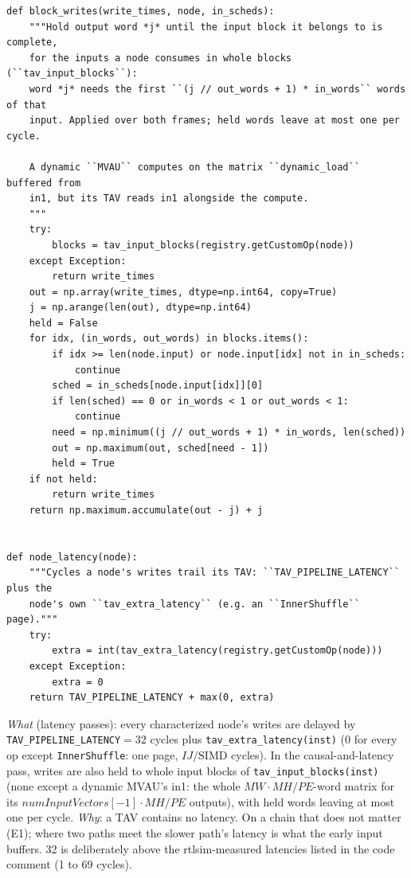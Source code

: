 \documentclass[10pt,a4paper]{article}
\newcommand{\code}[1]{\texttt{#1}}
\begin{document}
\begin{lstlisting}[firstnumber=521,title={\texttt{src/finn/transformation/fpgadataflow/derive\_characteristic.py}, lines 521--558}]
def block_writes(write_times, node, in_scheds):
    """Hold output word *j* until the input block it belongs to is complete,
    for the inputs a node consumes in whole blocks (``tav_input_blocks``):
    word *j* needs the first ``(j // out_words + 1) * in_words`` words of that
    input. Applied over both frames; held words leave at most one per cycle.

    A dynamic ``MVAU`` computes on the matrix ``dynamic_load`` buffered from
    in1, but its TAV reads in1 alongside the compute.
    """
    try:
        blocks = tav_input_blocks(registry.getCustomOp(node))
    except Exception:
        return write_times
    out = np.array(write_times, dtype=np.int64, copy=True)
    j = np.arange(len(out), dtype=np.int64)
    held = False
    for idx, (in_words, out_words) in blocks.items():
        if idx >= len(node.input) or node.input[idx] not in in_scheds:
            continue
        sched = in_scheds[node.input[idx]][0]
        if len(sched) == 0 or in_words < 1 or out_words < 1:
            continue
        need = np.minimum((j // out_words + 1) * in_words, len(sched))
        out = np.maximum(out, sched[need - 1])
        held = True
    if not held:
        return write_times
    return np.maximum.accumulate(out - j) + j


def node_latency(node):
    """Cycles a node's writes trail its TAV: ``TAV_PIPELINE_LATENCY`` plus the
    node's own ``tav_extra_latency`` (e.g. an ``InnerShuffle`` page)."""
    try:
        extra = int(tav_extra_latency(registry.getCustomOp(node)))
    except Exception:
        extra = 0
    return TAV_PIPELINE_LATENCY + max(0, extra)
\end{lstlisting}

\emph{What} (latency passes): every characterized node's writes are delayed by
\code{TAV\_PIPELINE\_LATENCY}$=32$ cycles plus \code{tav\_extra\_latency(inst)}
(0 for every op except \code{InnerShuffle}: one page, $I J/\mathrm{SIMD}$ cycles). In the causal-and-latency
pass, writes are also held to whole input blocks of \code{tav\_input\_blocks(inst)}
(none except a dynamic MVAU's in1: the whole $MW\cdot MH/PE$-word matrix for its
$\mathit{numInputVectors}[-1]\cdot MH/PE$ outputs), with held words leaving at most one per
cycle. \emph{Why}: a TAV contains no latency. On a chain that does not matter (E1);
where two paths meet the slower path's latency is what the early input buffers.
32 is deliberately above the rtlsim-measured latencies listed in the code comment (1 to 69 cycles).
\end{document}
